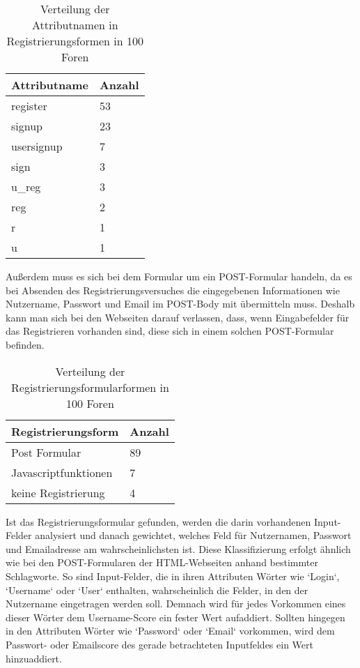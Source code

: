 \begin{table}[h!]
\centering 
\begin{tabular}{ | p{3cm} | p{3cm}|} \hline
Attributname & Anzahl \\ \hline
register & 53 \\ \hline
signup & 23 \\ \hline
usersignup & 7 \\ \hline
sign & 3 \\ \hline
u\_reg & 3 \\ \hline
reg & 2 \\ \hline
r & 1 \\ \hline
u & 1 \\ \hline
\end{tabular}
\caption{Verteilung der Attributnamen in Registrierungsformen in 100 Foren}
\end{table}



Außerdem muss es sich bei dem Formular um ein POST-Formular handeln, da es bei Absenden des Registrierungsversuches die eingegebenen Informationen wie Nutzername, Passwort und Email im POST-Body mit übermitteln muss.
Deshalb kann man sich bei den Webseiten darauf verlassen, dass, wenn Eingabefelder für das Registrieren vorhanden sind, diese sich in einem solchen POST-Formular befinden.

\begin{table}[h!]
\centering 
\begin{tabular}{ | p{5cm} | p{3cm}|} \hline
Registrierungsform & Anzahl \\ \hline
Post Formular & 89 \\ \hline
Javascriptfunktionen & 7 \\ \hline
keine Registrierung & 4 \\ \hline
\end{tabular}
\caption{Verteilung der Registrierungsformularformen in 100 Foren}
\end{table}


Ist das Registrierungsformular gefunden, werden die darin vorhandenen Input-Felder analysiert und danach gewichtet, welches Feld für Nutzernamen, Passwort und Emailadresse am wahrscheinlichsten ist.
Diese Klassifizierung erfolgt ähnlich wie bei den POST-Formularen der HTML-Webseiten anhand bestimmter Schlagworte.
So sind Input-Felder, die in ihren Attributen Wörter wie `Login`, `Username` oder `User` enthalten, wahrscheinlich die Felder, in den der Nutzername eingetragen werden soll. Demnach wird für jedes Vorkommen eines dieser Wörter dem Username-Score ein fester Wert aufaddiert. Sollten hingegen in den Attributen Wörter wie `Password` oder `Email` vorkommen, wird dem Passwort- oder Emailscore des gerade betrachteten Inputfeldes ein Wert hinzuaddiert.

